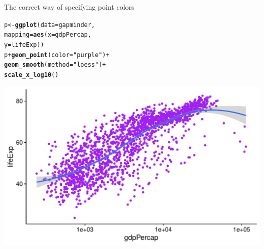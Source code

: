 \documentclass[10pt,handout]{beamer}\usepackage[]{graphicx}\usepackage[]{color}
\makeatletter
\def\maxwidth{ %
  \ifdim\Gin@nat@width>\linewidth
    \linewidth
  \else
    \Gin@nat@width
  \fi
}
\newcommand{\hlstr}[1]{\textcolor[rgb]{0.192,0.494,0.8}{#1}}%
\newcommand{\hlopt}[1]{\textcolor[rgb]{0,0,0}{#1}}%
\newcommand{\hlstd}[1]{\textcolor[rgb]{0.345,0.345,0.345}{#1}}%
\newcommand{\hlkwb}[1]{\textcolor[rgb]{0.69,0.353,0.396}{#1}}%
\newcommand{\hlkwc}[1]{\textcolor[rgb]{0.333,0.667,0.333}{#1}}%
\newcommand{\hlkwd}[1]{\textcolor[rgb]{0.737,0.353,0.396}{\textbf{#1}}}%
\newenvironment{kframe}{%
 \def\at@end@of@kframe{}%
 \ifinner\ifhmode%
  \def\at@end@of@kframe{\end{minipage}}%
  \begin{minipage}{\columnwidth}%
 \fi\fi%
 \def\FrameCommand##1{\hskip\@totalleftmargin \hskip-\fboxsep
 \colorbox{shadecolor}{##1}\hskip-\fboxsep
     \hskip-\linewidth \hskip-\@totalleftmargin \hskip\columnwidth}%
 \MakeFramed {\advance\hsize-\width
   \@totalleftmargin\z@ \linewidth\hsize
   \@setminipage}}%
 {\par\unskip\endMakeFramed%
 \at@end@of@kframe}
\newenvironment{knitrout}{}{} %
\makeatother
\begin{document}
\begin{frame}[fragile]{The correct way of specifying point colors}
\begin{knitrout}\tiny
{}\color{fgcolor}\begin{kframe}
\begin{alltt}
\hlstd{p} \hlkwb{<-} \hlkwd{ggplot}\hlstd{(}\hlkwc{data} \hlstd{= gapminder,}
                        \hlkwc{mapping} \hlstd{=} \hlkwd{aes}\hlstd{(}\hlkwc{x} \hlstd{= gdpPercap,}
                                        \hlkwc{y} \hlstd{= lifeExp))}
\hlstd{p} \hlopt{+} \hlkwd{geom_point}\hlstd{(}\hlkwc{color} \hlstd{=} \hlstr{"purple"}\hlstd{)} \hlopt{+}
        \hlkwd{geom_smooth}\hlstd{(}\hlkwc{method} \hlstd{=} \hlstr{"loess"}\hlstd{)} \hlopt{+}
        \hlkwd{scale_x_log10}\hlstd{()}
\end{alltt}
\end{kframe}

{\centering \includegraphics[width=\maxwidth]{figure/unnamed-chunk-13-1} 

}


\end{knitrout}
\end{frame}
\end{document}
